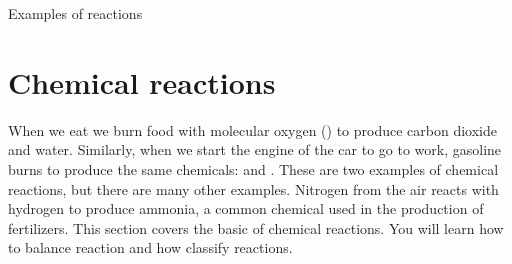 \documentclass[main.tex]{subfiles}
\begin{document}
\begin{marginfigure}[0cm]
\begin{tikzpicture}
\end{tikzpicture}
\caption{Examples of reactions}
\label{fig:molFig4}
\end{marginfigure}
\section{Chemical reactions}
When we eat we burn food with molecular oxygen () to produce carbon dioxide and water. Similarly, when we start the engine of the car to go to work, gasoline burns to produce the same chemicals:  and . These are two examples of chemical reactions, but there are many other examples. Nitrogen from the air reacts with hydrogen to produce ammonia, a common chemical used in the production of fertilizers. This section covers the basic of chemical reactions. You will learn how to balance reaction and how classify reactions.
\sloppy 
\end{document}
